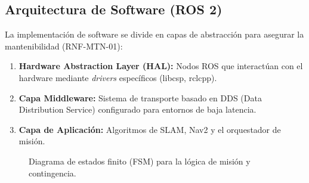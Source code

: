 \subsection{Arquitectura de Software (ROS 2)}
La implementación de software se divide en capas de abstracción para asegurar la mantenibilidad (RNF-MTN-01):
\begin{enumerate}
    \item \textbf{Hardware Abstraction Layer (HAL):} Nodos ROS que interactúan con el hardware mediante \textit{drivers} específicos (libcsp, rclcpp).
    \item \textbf{Capa Middleware:} Sistema de transporte basado en DDS (Data Distribution Service) configurado para entornos de baja latencia.
    \item \textbf{Capa de Aplicación:} Algoritmos de SLAM, Nav2 y el orquestador de misión.
\end{enumerate}

\begin{figure}[H]
    \centering
    \shorthandoff{>}\shorthandoff{<}
    \shorthandon{>}\shorthandon{<}
    \caption{Diagrama de estados finito (FSM) para la lógica de misión y contingencia.}
    \label{fig:diagrama_estados}
\end{figure}
